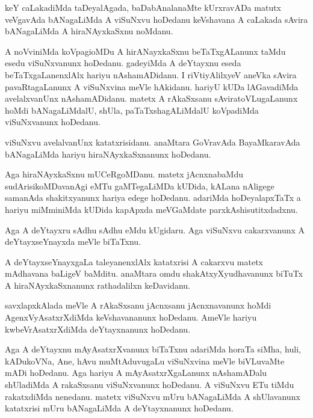 \documentclass{article}
\begin{document}
\begin{mng}%
keY caLakadiMda taDeyalAgada, baDabAnalanaMte kUrxravADa matutx veVgavAda bANagaLiMda A viSuNxvu 
hoDedanu keVshavana A caLakada sAvira bANagaLiMda A hiraNAyxkaSxnu noMdanu.
\end{mng}

\begin{mng}%
A noVviniMda koVpagioMDu A hirANayxkaSxnu beTaTxgALanunx taMdu esedu viSuNxvanunx hoDedanu. 
gadeyiMda A deYtayxnu eseda beTaTxgaLanenxlAlx hariyu nAshamADidanu. I riVtiyAlilxyeV aneVka 
sAvira pavaRtagaLanunx A viSuNxvina meVle hAkidanu. hariyU kUDa lAGavadiMda avelalxvanUnx 
nAshamADidanu. matetx  A rAkaSxsanu sAviratoVLugaLanunx hoMdi bANagaLiMdalU, shUla, 
paTaTxshagALiMdalU koVpadiMda viSuNxvanunx hoDedanu.
\end{mng}

\begin{mng}%
viSuNxvu avelalvanUnx katatxrisidanu. anaMtara GoVravAda BayaMkaravAda bANagaLiMda hariyu 
hiraNAyxkaSxnanunx hoDedanu.
\end{mng}

\begin{mng}%
Aga hiraNAyxkaSxnu mUCeRgoMDanu. matetx jAcnxnabaMdu sudArisikoMDavanAgi eMTu gaMTegaLiMDa kUDida, 
kALana nAligege samanAda shakitxyanunx hariya edege hoDedanu. adariMda hoDeyalapxTaTx a hariyu 
miMminiMda kUDida kapApxda meVGaMdate parxkAshisutitxdadxnu.
\end{mng}

\begin{mng}%
Aga A deYtayxru sAdhu sAdhu eMdu kUgidaru. Aga viSuNxvu cakarxvanunx A deYtayxseYnayxda meVle 
biTaTxnu.
\end{mng}

\begin{mng}%
A deYtayxseYnayxgaLa taleyanenxlAlx katatxrisi A cakarxvu matetx mAdhavana baLigeV baMditu. 
anaMtara omdu shakAtxyXyudhavanunx biTuTx A hiraNAyxkaSxnanunx rathadalilxn keDavidanu.
\end{mng}

\begin{mng}%
savxlapxkAlada meVle A rAkaSxsanu jAcnxsanu jAcnxnavanunx hoMdi AgenxVyAsatxrXdiMda keVshavananunx 
hoDedanu. AmeVle hariyu kwbeVrAsatxrXdiMda deYtayxnanunx hoDedanu.
\end{mng}

\begin{mng}%
Aga A deYtayxnu mAyAsatxrXvanunx biTaTxnu adariMda horaTa siMha, huli, kADukoVNa, Ane, hAvu 
muMtAduvugaLu viSuNxvina meVle biVLuvaMte mADi hoDedanu. Aga hariyu A mAyAsatxrXgaLanunx 
nAshamADalu shUladiMda A rakaSxsanu viSuNxvanunx hoDedanu. A viSuNxvu ETu tiMdu rakatxdiMda 
nenedanu. matetx viSuNxvu mUru bANagaLiMda A shUlavanunx katatxrisi mUru bANagaLiMda A 
deYtayxnanunx hoDedanu. 
\end{mng}
\end{document}
